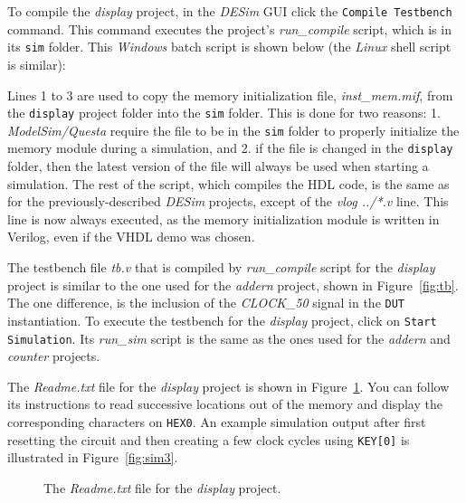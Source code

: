 \clearpage
\newpage
\noindent
To compile the {\it display} project, in the {\it DESim} GUI click the \texttt{Compile Testbench}
command. This command executes the project's {\it run\_compile} script, which
is in its \texttt{sim} folder. This {\it Windows} batch script is shown below (the {\it Linux}
shell script is similar):



Lines 1 to 3 are used to copy the memory initialization file,
{\it inst\_mem.mif}, from the \texttt{display} project folder into the \texttt{sim}
folder. This is done for two reasons: 1. {\it ModelSim/Questa} require the file to be in the
\texttt{sim} folder to properly initialize the memory module during a simulation, and 2. 
if the file is changed in the \texttt{display} folder, then the latest version of the file 
will always be used when starting a simulation. The rest of the script, which compiles the 
HDL code, is the same as for the previously-described {\it DESim} projects, except of the 
{\it vlog ../*.v} line. This line is now always executed, as the memory initialization module 
is written in Verilog, even if the VHDL demo was chosen.

The testbench file {\it tb.v} that is compiled by {\it run\_compile} script for the {\it display}
project is similar to the one used for the {\it addern} project, shown in Figure~\ref{fig:tb}. The
one difference, is the inclusion of the {\it CLOCK\_50} signal in the \texttt{DUT} instantiation.
To execute the testbench for the {\it display} project, click on 
\texttt{Start Simulation}. Its {\it run\_sim} script is the same as the 
ones used for the {\it addern} and {\it counter} projects.

The {\it Readme.txt} file for the {\it display} project is shown in Figure~\ref{fig:readme2}.
You can follow its instructions to read successive locations out of the memory and
display the corresponding characters on \texttt{HEX0}. An example simulation output after
first resetting the circuit and then creating a few clock cycles using \texttt{KEY[0]}
is illustrated in Figure~\ref{fig:sim3}.

\lstset{language=make,escapechar=|}
\begin{figure}[h]
\begin{center}
\begin{minipage}[t]{12.5 cm}
	
\end{minipage}
    \caption{The {\it Readme.txt} file for the {\it display} project.}
\label{fig:readme2}
\end{center}
\end{figure}

